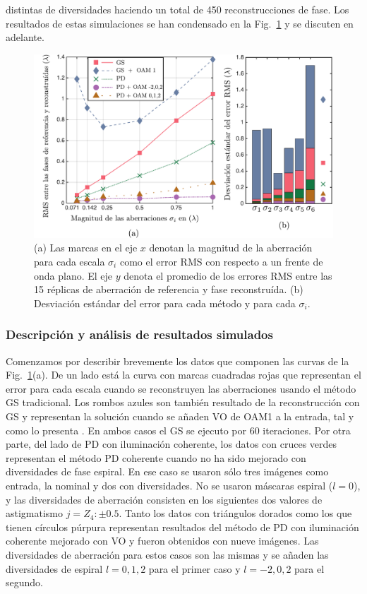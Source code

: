 distintas de diversidades haciendo un total de 450 reconstrucciones de
fase.  
Los resultados de estas simulaciones se han condensado en la
Fig.~\ref{fig:ChPD_RMS_error} y se discuten en adelante.  
\begin{figure}[h!]
\centering
\includegraphics[scale=.5]{mixed_wf_errors_esp.pdf}
\caption[Resultados de simulaciones con PD de iluminación
coherente.]{(a) Las marcas en el eje $x$ denotan la magnitud de la
  aberración para cada escala $\sigma_i$ como el error RMS con
  respecto a un frente de onda plano. El eje $y$ denota el promedio de
  los errores RMS entre las 15 réplicas de aberración de referencia y
  fase reconstruída. (b) Desviación estándar del error para cada
  método y para cada $\sigma_i$.} 
\label{fig:ChPD_RMS_error}
\end{figure}

\subsubsection{Descripción y análisis de resultados simulados}
Comenzamos por describir brevemente los datos que componen las curvas
de la Fig.~\ref{fig:ChPD_RMS_error}(a). 
De un lado está la curva con marcas cuadradas rojas que representan el error 
para cada escala cuando se reconstruyen las aberraciones usando el
método GS tradicional. Los rombos azules son también resultado de la
reconstrucción con GS y
representan la solución cuando se añaden VO de OAM1 a la entrada, tal
y como lo presenta . En ambos casos el GS se
ejecuto por 60 iteraciones. Por otra parte, del lado
de PD con iluminación coherente, los datos con cruces verdes
representan el método PD coherente cuando no ha sido mejorado con
diversidades de fase espiral.
En ese caso se usaron sólo tres imágenes como entrada, la nominal y
dos con diversidades. No se usaron máscaras espiral ($l=0$), y las
diversidades de aberración consisten en los siguientes dos valores de
astigmatismo $j=Z_4:\pm 0.5$. Tanto los datos con triángulos dorados
como los que tienen círculos púrpura representan resultados del
método de PD con iluminación coherente mejorado con VO y fueron
obtenidos con nueve imágenes. Las diversidades de aberración para
estos casos son las mismas y se añaden las diversidades de espiral
$l=0,1,2$ para el primer caso y $l=-2,0,2$ para el segundo.  

